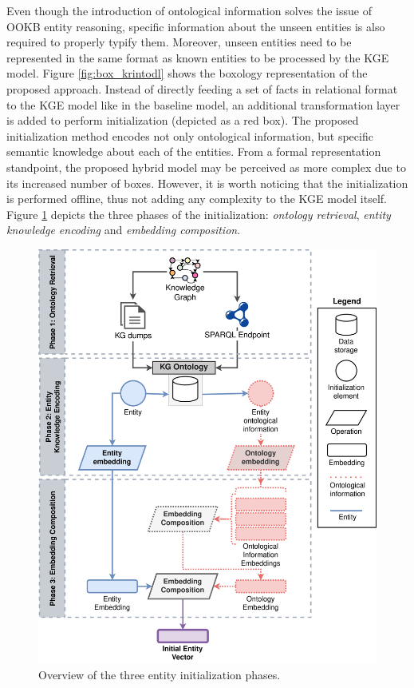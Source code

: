 Even though the introduction of ontological information solves the issue of OOKB entity reasoning, specific information about the unseen entities is also required to properly typify them. Moreover, unseen entities need to be represented in the same format as known entities to be processed by the KGE model. Figure \ref{fig:box_krintodl} shows the boxology representation of the proposed approach. Instead of directly feeding a set of facts in relational format to the KGE model like in the baseline model, an additional transformation layer is added to perform initialization (depicted as a red box). The proposed initialization method encodes not only ontological information, but specific semantic knowledge about each of the entities. From a formal representation standpoint, the proposed hybrid model may be perceived as more complex due to its increased number of boxes. However, it is worth noticing that the initialization is performed offline, thus not adding any complexity to the KGE model itself. Figure \ref{fig:semantic_based_initialization} depicts the three phases of the initialization: \textit{ontology retrieval}, \textit{entity knowledge encoding} and \textit{embedding composition}.

\begin{figure}
    \centering
    \includegraphics[width=.9\linewidth]{4_kbsintegrationdl/figures/Initialization_phases.eps}
    \caption{Overview of the three entity initialization phases.}
    \label{fig:semantic_based_initialization}
\end{figure}

